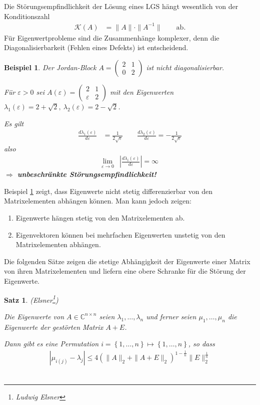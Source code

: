 \documentclass[%
a4paper,
11pt,		%
]
{scrartcl}
\newcommand{\C}{\mathbb{C}}
\theoremstyle{plain}
\theoremstyle{plain}
\newtheorem{mysatz}[mydef]{Satz}
\theoremstyle{plain}
\theoremstyle{plain}
\newtheorem{mybsp}[mydef]{Beispiel}
\begin{document}
Die Störungsempfindlichkeit der Lösung eines LGS hängt wesentlich von der Konditionszahl
\begin{align*}
  \mathcal{K}(A) & = \|A\| \cdot \|A^{-1}\| \qquad \text{ab.}
\end{align*}
Für Eigenwertprobleme sind die Zusammenhänge komplexer, denn die Diagonalisierbarkeit (Fehlen eines Defekts) ist entscheidend.
\begin{mybsp}\label{bspEWJordanBlock} Der Jordan-Block 
$A = 
\begin{pmatrix}
2 & 1\\
0 & 2
\end{pmatrix}
$
ist nicht diagonalisierbar. 

Für $\varepsilon > 0$ sei
$A(\varepsilon) = 
\begin{pmatrix}
2 & 1\\
\varepsilon & 2
\end{pmatrix}
$
mit den Eigenwerten $\lambda_1(\varepsilon)=2+\sqrt{2},\ \lambda_2(\varepsilon)=2-\sqrt{2}$.

Es gilt
\begin{align*}
\frac{d\lambda_1(\varepsilon)}{d\varepsilon} & = \frac{1}{2\sqrt{\varepsilon}} \qquad \frac{d\lambda_2(\varepsilon)}{d\varepsilon} = -\frac{1}{2\sqrt{\varepsilon}}
\end{align*}
also
\begin{align*}
\lim\limits_{\varepsilon\to0} & \left| \frac{d \lambda_i(\varepsilon)}{d \varepsilon} \right| = \infty
\end{align*}
\center $\Rightarrow$ \textbf{unbeschränkte Störungsempfindlichkeit!}
\end{mybsp}

Beispiel \ref{bspEWJordanBlock} zeigt, dass Eigenwerte nicht stetig differenzierbar von den Matrixelementen abhängen können. Man kann jedoch zeigen:
\begin{enumerate}
\item Eigenwerte hängen stetig von den Matrixelementen ab.
\item Eigenvektoren können bei mehrfachen Eigenwerten unstetig von den Matrixelementen abhängen.
\end{enumerate}

Die folgenden Sätze zeigen die stetige Abhängigkeit der Eigenwerte einer Matrix von ihren Matrixelementen und liefern eine obere Schranke für die Störung der Eigenwerte.

\begin{mysatz}(Elsner\footnote{Ludwig Elsner})

Die Eigenwerte von $A \in \C^{n \times n}$ seien $\lambda_1, \dots , \lambda_n$ und ferner seien $\mu_1, \dots , \mu_n$ die Eigenwerte der gestörten Matrix $A+E$.

Dann gibt es eine Permutation $i=\left\{ 1,\dots,n \right\} \mapsto \left\{ 1,\dots,n \right\}$, so dass
\begin{align*}
|\mu_{i(j)} - \lambda_j| \leq 4\left( \|A\|_2 + \|A+E\|_2 \right)^{1-\frac{1}{n}} \|E\|_2^{\frac{1}{n}}
\end{align*}
\
\end{mysatz}
\end{document}
